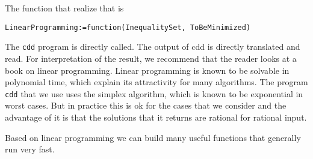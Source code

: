 \documentclass[12pt]{amsart}
\begin{document}
The function that realize that is
\begin{verbatim}
LinearProgramming:=function(InequalitySet, ToBeMinimized)
\end{verbatim}
The {\tt cdd} program is directly called.
The output of cdd is directly translated and read.
For interpretation of the result, we recommend that the reader looks at a
book on linear programming.
Linear programming is known to be solvable in polynomial time, which
explain its attractivity for many algorithms.
The program {\tt cdd} that we use uses the simplex algorithm, which is
known to be exponential in worst cases. But in practice this is ok
for the cases that we consider and the advantage of it is that the solutions
that it returns are rational for rational input.


Based on linear programming we can build many useful functions that generally run very fast.
\end{document}

